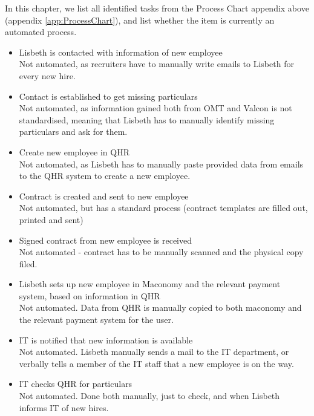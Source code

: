 In this chapter, we list all identified tasks from the Process Chart appendix above (appendix \ref*{app:ProcessChart}), and list whether the item is currently an automated process. 

\begin{itemize}
	\item{Lisbeth is contacted with information of new employee}\\
		Not automated, as recruiters have to manually write emails to Lisbeth for every new hire.
		
	\item{Contact is established to get missing particulars}\\
		Not automated, as information gained both from OMT and Valcon is not standardised, meaning that Lisbeth has to manually identify missing particulars and ask for them.
		
	\item{Create new employee in QHR}\\
		Not automated, as Lisbeth has to manually paste provided data from emails to the QHR system to create a new employee.
	
	\item{Contract is created and sent to new employee}\\
		Not automated, but has a standard process (contract templates are filled out, printed and sent)
	
	\item{Signed contract from new employee is received}\\
		Not automated - contract has to be manually scanned and the physical copy filed.
	
	\item{Lisbeth sets up new employee in Maconomy and the relevant payment system, based on information in QHR}\\
		Not automated. Data from QHR is manually copied to both maconomy and the relevant payment system for the user.
	
	\item{IT is notified that new information is available}\\
		Not automated. Lisbeth manually sends a mail to the IT department, or verbally tells a member of the IT staff that a new employee is on the way.
	
	\item{IT checks QHR for particulars}\\
		Not automated. Done both manually, just to check, and when Lisbeth informs IT of new hires.
	

\end{itemize}
